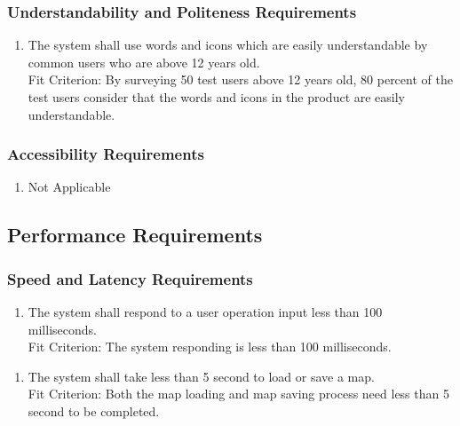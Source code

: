 \documentclass[12pt, titlepage]{article}
\begin{document}
\subsubsection{Understandability and Politeness Requirements}
\label{ssub:understandability_and_politeness_requirements}
\begin{enumerate}
	\item The system shall use words and icons which are easily understandable by common users who are above 12 years old.
	\\
	
	Fit Criterion: By surveying 50 test users above 12 years old, 80 percent of the test users consider that the words and icons in the product are easily understandable.
\end{enumerate}

\subsubsection{Accessibility Requirements}
\label{ssub:accessibility_requirements}
\begin{enumerate}
	\item Not Applicable
\end{enumerate}


\subsection{Performance Requirements}
\label{sub:performance_requirements}

\subsubsection{Speed and Latency Requirements}
\label{ssub:speed_and_latency_requirements}
\begin{enumerate}[{PR}1. ]
	\item The system shall respond to a user operation input less than 100 milliseconds.
	\\
	
	Fit Criterion: The system responding is less than 100 milliseconds.
\end{enumerate}

\begin{enumerate}[{PR}2. ]
	\item The system shall take less than 5 second to load or save a map.
	\\
	
	Fit Criterion: Both the map loading and map saving process need less than 5 second to be completed.
\end{enumerate}
\end{document}
